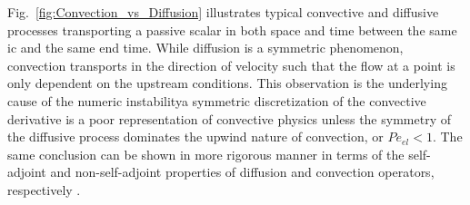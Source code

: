 Fig.\ \ref{fig:Convection_vs_Diffusion} illustrates typical convective and diffusive processes transporting a passive scalar in both space and time between the same \gls{ic} and the same end time. While diffusion is a symmetric phenomenon, convection transports in the direction of velocity such that the flow at a point is only dependent on the upstream conditions. This observation is the underlying cause of the numeric instability\mdash a symmetric discretization of the convective derivative is a poor representation of convective physics unless the symmetry of the diffusive process dominates the upwind nature of convection, or \(Pe_{el}<1\). The same conclusion can be shown in more rigorous manner in terms of the self-adjoint and non-self-adjoint properties of diffusion and convection operators, respectively \cite{zienkiewicz}.

